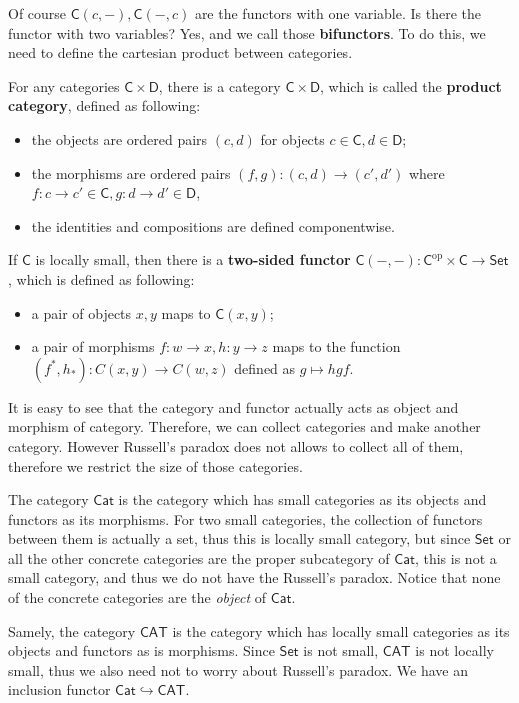 Of course $\mathsf{C}(c,-), \mathsf{C}(-,c)$ are the functors with one variable. Is there the functor with two variables? Yes, and we call those \textbf{bifunctors}. To do this, we need to define the cartesian product between categories.
\begin{defn} For any categories $\mathsf{C}\times \mathsf{D}$, there is a category $\mathsf{C}\times \mathsf{D}$, which is called the \textbf{product category}, defined as following:
\begin{itemize}
\item the objects are ordered pairs $(c,d)$ for objects $c\in \mathsf{C},d\in \mathsf{D}$;
\item the morphisms are ordered pairs $(f,g):(c,d)\rightarrow (c',d')$ where $f:c\rightarrow c'\in \mathsf{C}, g:d\rightarrow d'\in\mathsf{D}$,
\item the identities and compositions are defined componentwise.
\end{itemize}
\end{defn}
\begin{defn} If $\mathsf{C}$ is locally small, then there is a \textbf{two-sided functor} $\mathsf{C}(-,-):\mathsf{C}^{\mathrm{op}}\times \mathsf{C}\rightarrow \mathsf{Set}$, which is defined as following:
\begin{itemize}
\item a pair of objects $x,y$ maps to $\mathsf{C}(x,y)$;
\item a pair of morphisms $f:w\rightarrow x, h:y\rightarrow z$ maps to the function $(f^*,h_*):C(x,y)\rightarrow C(w,z)$ defined as $g\mapsto hgf$.
\end{itemize}
\end{defn}

It is easy to see that the category and functor actually acts as object and morphism of category. Therefore, we can collect categories and make another category. However Russell's paradox does not allows to collect all of them, therefore we restrict the size of those categories.

\begin{defn}The category $\mathsf{Cat}$ is the category which has small categories as its objects and functors as its morphisms. For two small categories, the collection of functors between them is actually a set, thus this is locally small category, but since $\mathsf{Set}$ or all the other concrete categories are the proper subcategory of $\mathsf{Cat}$, this is not a small category, and thus we do not have the Russell's paradox. Notice that none of the concrete categories are the \textit{object} of $\mathsf{Cat}$.

Samely, the category $\mathsf{CAT}$ is the category which has locally small categories as its objects and functors as is morphisms. Since $\mathsf{Set}$ is not small, $\mathsf{CAT}$ is not locally small, thus we also need not to worry about Russell's paradox. We have an inclusion functor $\mathsf{Cat}\hookrightarrow \mathsf{CAT}$.
\end{defn}

